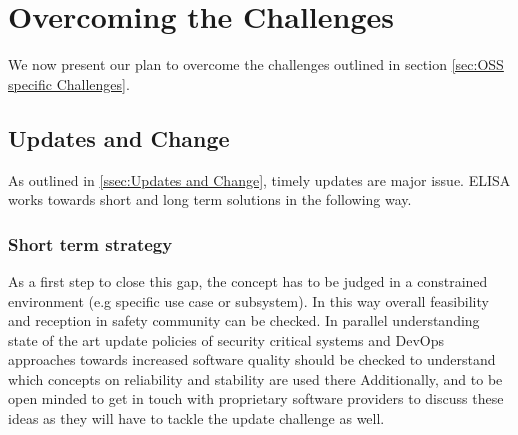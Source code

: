 \documentclass[12pt]{ElisaPaper}
\begin{document}
\section{Overcoming the Challenges}
We now present our plan to overcome the challenges outlined in section \ref{sec:OSS specific Challenges}.

\subsection{Updates and Change}
As outlined in \ref{ssec:Updates and Change}, timely updates are major issue.
ELISA works towards short and long term solutions in the following way.

\subsubsection{Short term strategy}
As a first step to close this gap, the concept has to be judged in a constrained environment (e.g specific use case or subsystem).
In this way overall feasibility and reception in safety community can be checked.
In parallel understanding state of the art update policies of security critical systems and DevOps approaches towards increased software quality should be checked to understand which concepts on reliability and stability are used there Additionally, and to be open minded to get in touch with proprietary software providers to discuss these ideas as they will have to tackle the update challenge as well.
\end{document}
